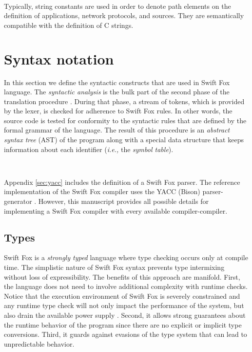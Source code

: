 \documentclass[11pt]{article}
\begin{document}
\

\hangindent=4cm
\small
\noindent
Typically, string constants are used in order to denote path elements on
the definition of applications, network protocols, and sources. They are
semantically compatible with the definition of C strings.
\normalsize


\section{Syntax notation}

In this section we define the syntactic constructs that are used in Swift
Fox language. The \textit{syntactic analysis} is the bulk part of the
second phase of the translation procedure \cite{aho:2007}. During that
phase, a stream of tokens, which is provided by the lexer, is checked for
adherence to Swift Fox rules. In other words, the source code is tested for
conformity to the syntactic rules that are defined by the formal grammar of
the language. The result of this procedure is an \textit{abstract syntax
tree} (AST) of the program along with a special data structure that keeps
information about each identifier (\textit{i.e.,} the \textit{symbol
table}).

\

\hangindent=4cm
\small
\noindent
Appendix \ref{sec:yacc} includes the definition of a Swift Fox parser. The
reference implementation of the Swift Fox compiler uses the YACC (Bison)
parser-generator \cite{johnson:1975,bison:2010}. However, this manuscript
provides all possible details for implementing a Swift Fox compiler with
every available compiler-compiler.
\normalsize

\subsection{Types}
\label{sec:types}

Swift Fox is a \textit{strongly typed} language \cite{cardelli:1991} where
type checking occurs only at compile time. The simplistic nature of Swift
Fox syntax prevents type intermixing without loss of expressibility. The
benefits of this approach are manifold. First, the language does not need
to involve additional complexity with runtime checks. Notice that the
execution environment of Swift Fox is severely constrained and any runtime 
type check will not only impact the performance of the system, but also
drain the available power supply \cite{marcin:whitepaper}. Second, it
allows strong guarantees about the runtime behavior of the program since
there are no explicit or implicit type conversions. Third, it guards
against evasions of the type system that can lead to unpredictable
behavior.
\end{document}
